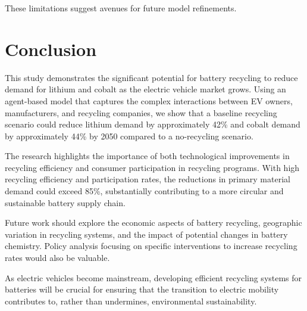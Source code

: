 \documentclass[10pt,a4paper,twocolumn]{article}
\begin{document}
These limitations suggest avenues for future model refinements.

\section{Conclusion}
\label{sec:conclusion}

This study demonstrates the significant potential for battery recycling to reduce demand for lithium and cobalt as the electric vehicle market grows. Using an agent-based model that captures the complex interactions between EV owners, manufacturers, and recycling companies, we show that a baseline recycling scenario could reduce lithium demand by approximately 42\% and cobalt demand by approximately 44\% by 2050 compared to a no-recycling scenario.

The research highlights the importance of both technological improvements in recycling efficiency and consumer participation in recycling programs. With high recycling efficiency and participation rates, the reductions in primary material demand could exceed 85\%, substantially contributing to a more circular and sustainable battery supply chain.

Future work should explore the economic aspects of battery recycling, geographic variation in recycling systems, and the impact of potential changes in battery chemistry. Policy analysis focusing on specific interventions to increase recycling rates would also be valuable.

As electric vehicles become mainstream, developing efficient recycling systems for batteries will be crucial for ensuring that the transition to electric mobility contributes to, rather than undermines, environmental sustainability.
\end{document}
